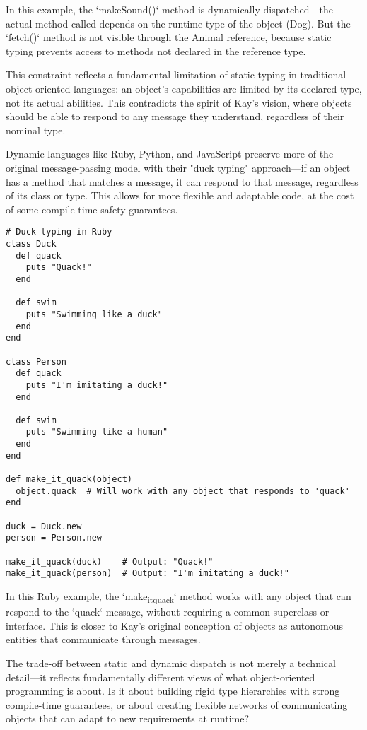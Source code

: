 \documentclass[11pt]{article}
\begin{document}
In this example, the `makeSound()` method is dynamically dispatched—the actual method called depends on the runtime type of the object (Dog). But the `fetch()` method is not visible through the Animal reference, because static typing prevents access to methods not declared in the reference type.

This constraint reflects a fundamental limitation of static typing in traditional object-oriented languages: an object's capabilities are limited by its declared type, not its actual abilities. This contradicts the spirit of Kay's vision, where objects should be able to respond to any message they understand, regardless of their nominal type.

Dynamic languages like Ruby, Python, and JavaScript preserve more of the original message-passing model with their "duck typing" approach—if an object has a method that matches a message, it can respond to that message, regardless of its class or type. This allows for more flexible and adaptable code, at the cost of some compile-time safety guarantees.

\begin{verbatim}
# Duck typing in Ruby
class Duck
  def quack
    puts "Quack!"
  end

  def swim
    puts "Swimming like a duck"
  end
end

class Person
  def quack
    puts "I'm imitating a duck!"
  end

  def swim
    puts "Swimming like a human"
  end
end

def make_it_quack(object)
  object.quack  # Will work with any object that responds to 'quack'
end

duck = Duck.new
person = Person.new

make_it_quack(duck)    # Output: "Quack!"
make_it_quack(person)  # Output: "I'm imitating a duck!"
\end{verbatim}

In this Ruby example, the `make\textsubscript{it}\textsubscript{quack}` method works with any object that can respond to the `quack` message, without requiring a common superclass or interface. This is closer to Kay's original conception of objects as autonomous entities that communicate through messages.

The trade-off between static and dynamic dispatch is not merely a technical detail—it reflects fundamentally different views of what object-oriented programming is about. Is it about building rigid type hierarchies with strong compile-time guarantees, or about creating flexible networks of communicating objects that can adapt to new requirements at runtime?
\end{document}
